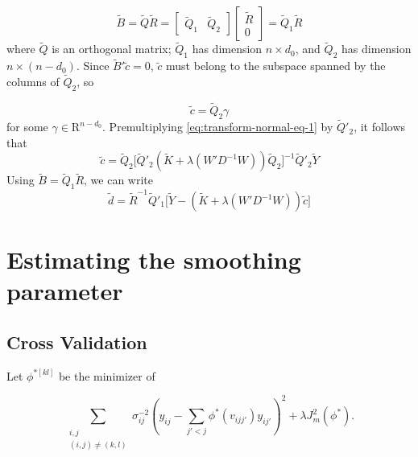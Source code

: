 \documentclass[12pt]{article}
\newcommand{\tildeK}{\tilde{K}}
\newcommand{\tildec}{\tilde{c}}
\newcommand{\tildeB}{\tilde{B}}
\newcommand{\tilded}{\tilde{d}}
\newcommand{\tildeY}{\tilde{Y}}
\newcommand{\tildeQ}{\tilde{Q}}
\newcommand{\tildeR}{\tilde{R}}
\theoremstyle{definition}
\begin{document}
\begin{equation*}
\tildeB = \tildeQ\tildeR = \begin{bmatrix} \tildeQ_1 &  \tildeQ_2 \end{bmatrix} \begin{bmatrix} \tildeR \\  0 \end{bmatrix} = \tildeQ_1 \tildeR
\end{equation*}
\noindent
where $\tildeQ$ is an orthogonal matrix; $\tildeQ_1$ has dimension $n \times d_0$,  and $\tildeQ_2$ has dimension $n \times \left(n-d_0\right)$. Since $\tildeB'\tildec = 0$, $\tildec$ must belong to the subspace spanned by the columns of $\tildeQ_2$, so 

\[
\tildec = \tildeQ_2 \gamma
\] 
\noindent
for some $\gamma \in \mathrm{R}^{n-d_0}$. Premultiplying \ref{eq:transform-normal-eq-1} by $\tildeQ'_2$, it follows that 
\begin{equation} \label{eq:solve-for-ctilde}
\tildec =  \tildeQ_2\bigg[ \tildeQ'_2 \left( \tildeK + \lambda \left( W' D^{-1} W \right) \right)\tildeQ_2 \bigg]^{-1} \tildeQ'_2 \tildeY
\end{equation}
\bigskip
\noindent
Using $\tildeB = \tildeQ_1 \tildeR$, we can write
\begin{equation} \label{eq:solve-for-dtilde}
\tilded = \tildeR^{-1} \tildeQ'_1 \bigg[ \tildeY - \left( \tildeK + \lambda \left( W' D^{-1} W \right) \right) \tildec  \bigg]
\end{equation}

\section{Estimating the smoothing parameter}

\subsection{Cross Validation}

Let $\phi^{*[kl]}$ be the minimizer of 

\begin{equation}
\sum_{\substack{i,j \\ \left(i,j\right)\neq \left(k,l\right)}}  \sigma^{-2}_{ij}\left( y_{ij} -  \sum_{j'<j}\phi^*\left( v_{ijj'} \right) y_{ij'} \right)^2 + \lambda J_m^2 \left( \phi^* \right).
\end{equation}
\bigskip
\end{document}
